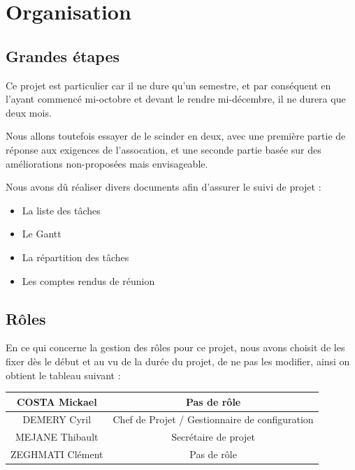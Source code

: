\documentclass[11pt]{report}
\begin{document}
\section{Organisation}
\subsection{Grandes étapes}
Ce projet est particulier car il ne dure qu'un semestre, et par conséquent en 
l'ayant commencé mi-octobre et devant le rendre mi-décembre, il ne durera que 
deux mois. \\
\par Nous allons toutefois essayer de le scinder en deux, avec une première 
partie de réponse aux exigences de l'assocation, et une seconde partie basée 
sur des améliorations non-proposées mais envisageable.

Nous avons dû réaliser divers documents afin d'assurer le suivi de projet : 
\begin{itemize}
    \item La liste des tâches
    \item Le Gantt
    \item La répartition des tâches
    \item Les comptes rendus de réunion \\
\end{itemize}

\subsection{Rôles}
En ce qui concerne la gestion des rôles pour ce projet, nous avons choisit de 
les fixer dès le début et au vu de la durée du projet, de ne pas les modifier, 
ainsi on obtient le tableau suivant :  
\par
\begin{tabular}{ | c | c | }
\hline 
   COSTA Mickael & Pas de rôle  \\ \hline 
   DEMERY Cyril & Chef de Projet / Gestionnaire de configuration \\ \hline 
   MEJANE Thibault & Secrétaire de projet \\ \hline 
   ZEGHMATI Clément & Pas de rôle \\ \hline
 \end{tabular}
\end{document}
